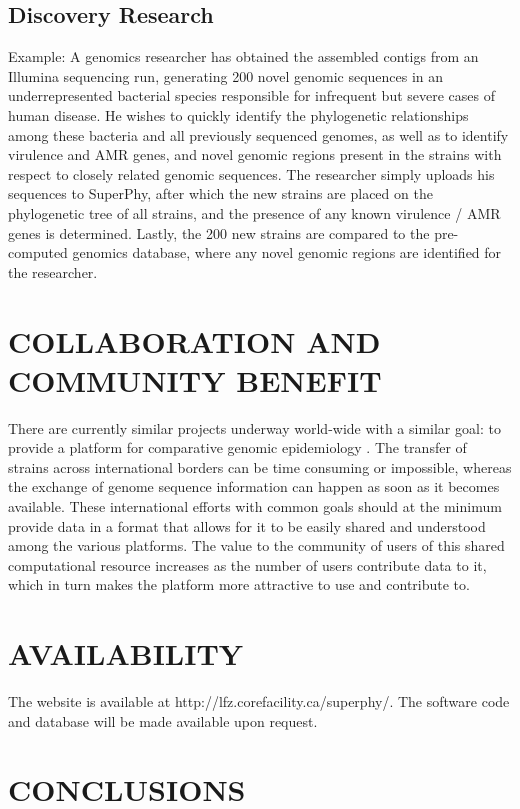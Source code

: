 \documentclass[a4paper,twoside]{article}
\begin{document}
\subsection{Discovery Research}
Example: A genomics researcher has obtained the assembled contigs from an Illumina sequencing run, generating 200 novel genomic sequences in an underrepresented bacterial species responsible for infrequent but severe cases of human disease. He wishes to quickly identify the phylogenetic relationships among these bacteria and all previously sequenced genomes, as well as to identify virulence and AMR genes, and novel genomic regions present in the strains with respect to closely related genomic sequences. The researcher simply uploads his sequences to SuperPhy, after which the new strains are placed on the phylogenetic tree of all strains, and the presence of any known virulence / AMR genes is determined. Lastly, the 200 new strains are compared to the pre-computed genomics database, where any novel genomic regions are identified for the researcher.

\section{\uppercase{Collaboration and Community Benefit}}
\label{sec:collaboration}
There are currently similar projects underway world-wide with a similar goal: to provide a platform for comparative genomic epidemiology \cite{kupferschmidt_outbreak_2011}. The transfer of strains across international borders can be time consuming or impossible, whereas the exchange of genome sequence information can happen as soon as it becomes available. These international efforts with common goals should at the minimum provide data in a format that allows for it to be easily shared and understood among the various platforms. The value to the community of users of this shared computational resource increases as the number of users contribute data to it, which in turn makes the platform more attractive to use and contribute to.

\section{\uppercase{Availability}}
\label{sec:availability}

The website is available at http://lfz.corefacility.ca/superphy/. The software code and database will be made available upon request.

\section{\uppercase{Conclusions}}
\label{sec:conclusion}
\end{document}
